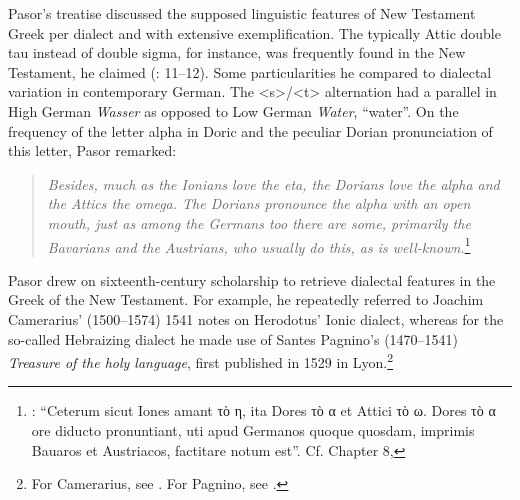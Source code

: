 Pasor’s treatise discussed the supposed linguistic features of New Testament Greek per dialect and with extensive exemplification. The typically Attic double tau instead of double sigma, for instance, was frequently found in the New Testament, he claimed (\citealt{Pasor1632}: 11–12). Some particularities he compared to dialectal variation in contemporary German. The <s>/<t> alternation had a parallel in High German \textit{Wasser} as opposed to Low German \textit{Water}, “water”. On the frequency of the letter alpha in Doric and the peculiar Dorian pronunciation of this letter, Pasor remarked:

\begin{quote}
\emph{\textup{Besides,} \emph{much} \emph{as} \emph{the} \emph{Ionians} \emph{love} \emph{the} \emph{eta,} \emph{the} \emph{Dorians} \emph{love} \emph{the} \emph{alpha} \emph{and} \emph{the} \emph{Attics} \emph{the} \emph{omega.} \emph{The} \emph{Dorians} \emph{pronounce} \emph{the} \emph{alpha} \emph{with} \emph{an} \emph{open} \emph{mouth,} \emph{just} \emph{as} \emph{among} \emph{the} \emph{Germans} \emph{too} \emph{there} \emph{are} \emph{some,} \emph{primarily} \emph{the} \emph{Bavarians} \emph{and} \emph{the} \emph{Austrians,} \emph{who} \emph{usually} \emph{do} \emph{this,} \emph{as} \emph{is} \emph{well-known.}}\footnote{\citet[28]{Pasor1632}: “Ceterum sicut Iones amant τὸ η, ita Dores τὸ α et Attici τὸ ω. Dores τὸ α ore diducto pronuntiant, uti apud Germanos quoque quosdam, imprimis Bauaros et Austriacos, factitare notum est”. Cf. Chapter 8, }
\end{quote}

Pasor drew on sixteenth-century scholarship to retrieve dialectal features in the Greek of the New Testament. For example, he repeatedly referred to Joachim Camerarius’ (1500–1574) 1541 notes on Herodotus’ Ionic dialect, whereas for the so-called Hebraizing dialect he made use of Santes Pagnino’s (1470–1541) \textit{Treasure of the holy language}, first published in 1529 in Lyon.\footnote{For Camerarius, see \citet[24-25, 27-28]{Pasor1632}. For Pagnino, see \citet[36]{Pasor1632}.}

